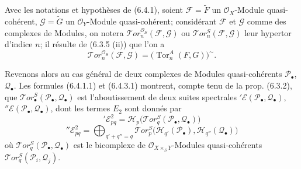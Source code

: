 \begin{env}[6.4.3]
Avec les notations et hypothèses de (6.4.1), soient
$\mathscr F=\widetilde F$ un $\mathscr O_X$-Module quasi-cohérent,
$\mathscr G=\widetilde G$ un $\mathscr O_Y$-Module quasi-cohérent;
considérant $\mathscr F$ et $\mathscr G$ comme des complexes de Modules, on
notera $\mathscr{T}\!or_n^{\mathscr O_S}(\mathscr F,\mathscr G)$ ou
$\mathscr{T}\!or_n^S(\mathscr F,\mathscr G)$ leur hypertor d'indice $n$; il
résulte de (6.3.5 (ii)) que l'on a
\[
  \mathscr{T}\!or_n^{\mathscr O_S}(\mathscr F,\mathscr G)
  =\bigl(\operatorname{Tor}_n^A(F,G)\bigr)^{\sim}.
  \tag{6.4.3.1}\label{III.6.4.3.1.fr}
\]

Revenons alors au cas général de deux complexes de Modules quasi-cohérents
$\mathscr P_\bullet$, $\mathscr Q_\bullet$. Les formules (6.4.1.1) et
(6.4.3.1) montrent, compte tenu de la prop. (6.3.2), que
$\mathscr{T}\!or_\bullet^S(\mathscr P_\bullet,\mathscr Q_\bullet)$ est
l'aboutissement de deux suites spectrales
$'\mathscr E(\mathscr P_\bullet,\mathscr Q_\bullet)$,
$''\mathscr E(\mathscr P_\bullet,\mathscr Q_\bullet)$, dont les termes
$E_2$ sont donnés par
\[
  '\mathscr E_{pq}^2
  =\mathscr H_p\bigl(\mathscr{T}\!or_q^S
    (\mathscr P_\bullet,\mathscr Q_\bullet)\bigr)
  \tag{6.4.3.2}\label{III.6.4.3.2.fr}
\]
\[
  ''\mathscr E_{pq}^2
  =\bigoplus_{q'+q''=q}
  \mathscr{T}\!or_p^S
  \bigl(\mathscr H_{q'}(\mathscr P_\bullet),
        \mathscr H_{q''}(\mathscr Q_\bullet)\bigr)
  \tag{6.4.3.3}\label{III.6.4.3.3.fr}
\]
où $\mathscr{T}\!or_q^S(\mathscr P_\bullet,\mathscr Q_\bullet)$ est le
bicomplexe de $\mathscr O_{X\times_S Y}$-Modules quasi-cohérents
$\mathscr{T}\!or_q^S(\mathscr P_i,\mathscr Q_j)$.
\end{env}

